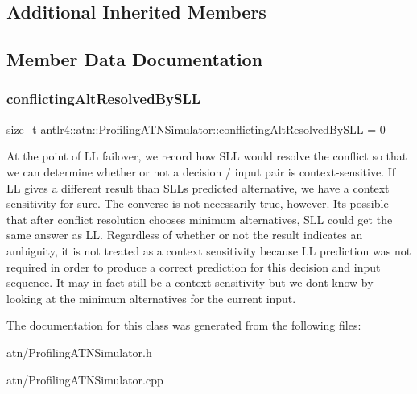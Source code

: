\subsection*{Additional Inherited Members}


\subsection{Member Data Documentation}
\mbox{\label{classantlr4_1_1atn_1_1ProfilingATNSimulator_a5bbda69bda28802f01fb9171d25b42b8}} 
\subsubsection{\texorpdfstring{conflicting\+Alt\+Resolved\+By\+S\+LL}{conflictingAltResolvedBySLL}}
{\footnotesize\ttfamily size\+\_\+t antlr4\+::atn\+::\+Profiling\+A\+T\+N\+Simulator\+::conflicting\+Alt\+Resolved\+By\+S\+LL = 0\hspace{0.3cm}{\ttfamily [protected]}}



At the point of LL failover, we record how S\+LL would resolve the conflict so that we can determine whether or not a decision / input pair is context-\/sensitive. If LL gives a different result than S\+LL\textquotesingle{}s predicted alternative, we have a context sensitivity for sure. The converse is not necessarily true, however. It\textquotesingle{}s possible that after conflict resolution chooses minimum alternatives, S\+LL could get the same answer as LL. Regardless of whether or not the result indicates an ambiguity, it is not treated as a context sensitivity because LL prediction was not required in order to produce a correct prediction for this decision and input sequence. It may in fact still be a context sensitivity but we don\textquotesingle{}t know by looking at the minimum alternatives for the current input. 



The documentation for this class was generated from the following files\+:\begin{DoxyCompactItemize}
\item 
atn/Profiling\+A\+T\+N\+Simulator.\+h\item 
atn/Profiling\+A\+T\+N\+Simulator.\+cpp\end{DoxyCompactItemize}
